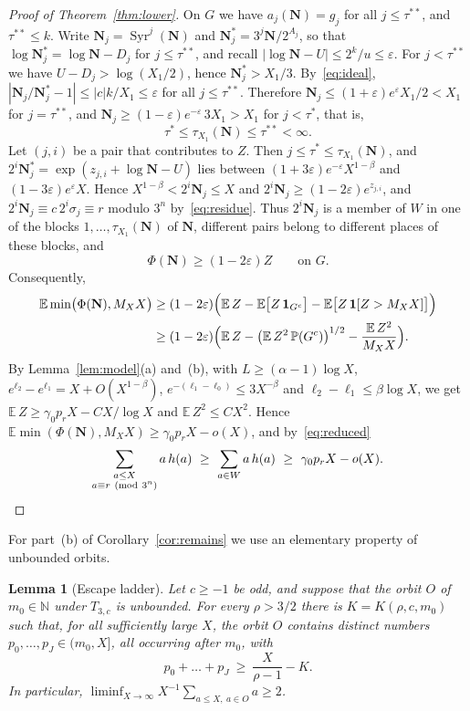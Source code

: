 \documentclass[12pt]{amsart}
\newtheorem{lemma}{Lemma}
\theoremstyle{definition}
\theoremstyle{remark}
\newcommand{\N}{\mathbb{N}}
\begin{document}
\begin{proof}[Proof of Theorem~\ref{thm:lower}]
On $G$ we have $a_j(\mathbf N)=g_j$ for all $j\le\tau^{**}$, and $\tau^{**}\le k$. Write $\mathbf N_j=\operatorname{Syr}^j(\mathbf N)$ and $\mathbf N_j^*=3^j\mathbf N/2^{A_j}$, so that $\log\mathbf N_j^*=\log\mathbf N-D_j$ for $j\le\tau^{**}$, and recall $|\log\mathbf N-U|\le2^k/u\le\varepsilon$. For $j<\tau^{**}$ we have $U-D_j>\log(X_1/2)$, hence $\mathbf N_j^*>X_1/3$. By~\eqref{eq:ideal}, $|\mathbf N_j/\mathbf N_j^*-1|\le|c|k/X_1\le\varepsilon$ for all $j\le\tau^{**}$. Therefore $\mathbf N_j\le(1+\varepsilon)e^{\varepsilon}X_1/2<X_1$ for $j=\tau^{**}$, and $\mathbf N_j\ge(1-\varepsilon)e^{-\varepsilon}\,3X_1>X_1$ for $j<\tau^*$, that is,
\[
\tau^*\le\tau_{X_1}(\mathbf N)\le\tau^{**}<\infty .
\]
Let $(j,i)$ be a pair that contributes to $Z$. Then $j\le\tau^*\le\tau_{X_1}(\mathbf N)$, and $2^i\mathbf N_j^*=\exp(z_{j,i}+\log\mathbf N-U)$ lies between $(1+3\varepsilon)e^{-\varepsilon}X^{1-\beta}$ and $(1-3\varepsilon)e^{\varepsilon}X$. Hence $X^{1-\beta}<2^i\mathbf N_j\le X$ and $2^i\mathbf N_j\ge(1-2\varepsilon)e^{z_{j,i}}$, and $2^i\mathbf N_j\equiv c\,2^i\sigma_j\equiv r$ modulo $3^n$ by~\eqref{eq:residue}. Thus $2^i\mathbf N_j$ is a member of $W$ in one of the blocks $1,\ldots,\tau_{X_1}(\mathbf N)$ of $\mathbf N$, different pairs belong to different places of these blocks, and
\[
\Phi(\mathbf N)\ge(1-2\varepsilon)Z\qquad\text{on }G .
\]
Consequently,
\begin{align*}
\mathbb E\min\bigl(\Phi(\mathbf N),M_XX\bigr)&\ge(1-2\varepsilon)\Bigl(\mathbb E\,Z-\mathbb E\bigl[Z\,\mathbf 1_{G^c}\bigr]-\mathbb E\bigl[Z\,\mathbf 1[Z>M_XX]\bigr]\Bigr)\\
&\ge(1-2\varepsilon)\Bigl(\mathbb E\,Z-\bigl(\mathbb E\,Z^2\,\mathbb P(G^c)\bigr)^{1/2}-\frac{\mathbb E\,Z^2}{M_XX}\Bigr).
\end{align*}
By Lemma~\ref{lem:model}(a) and~(b), with $L\ge(\alpha-1)\log X$, $e^{\ell_2}-e^{\ell_1}=X+O(X^{1-\beta})$, $e^{-(\ell_1-\ell_0)}\le3X^{-\beta}$ and $\ell_2-\ell_1\le\beta\log X$, we get $\mathbb E\,Z\ge\gamma_0p_rX-CX/\log X$ and $\mathbb E\,Z^2\le CX^2$. Hence $\mathbb E\min(\Phi(\mathbf N),M_XX)\ge\gamma_0p_rX-o(X)$, and by~\eqref{eq:reduced}
\[
\sum_{\substack{a\le X\\ a\equiv r\ (\mathrm{mod}\ 3^n)}}a\,h(a)\ \ge\ \sum_{a\in W}a\,h(a)\ \ge\ \gamma_0p_rX-o(X).\qedhere
\]
\end{proof}


For part~(b) of Corollary~\ref{cor:remains} we use an elementary property of unbounded orbits.

\begin{lemma}[Escape ladder]
\label{lem:escape-ladder}
Let $c\ge-1$ be odd, and suppose that the orbit $O$ of $m_0\in\N$ under $T_{3,c}$ is unbounded. For every $\rho>3/2$ there is $K=K(\rho,c,m_0)$ such that, for all sufficiently large $X$, the orbit $O$ contains distinct numbers $p_0,\ldots,p_J\in(m_0,X]$, all occurring after $m_0$, with
\[
 p_0+\dots+p_J\ \ge\ \frac{X}{\rho-1}-K .
\]
In particular, $\liminf_{X\to\infty}X^{-1}\sum_{a\le X,\ a\in O}a\ge2$.
\end{lemma}
\end{document}

